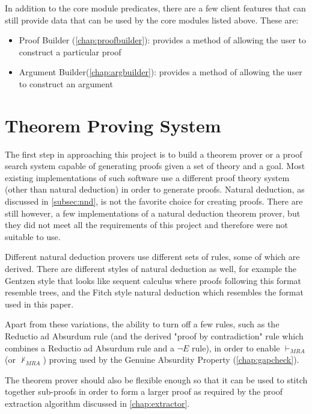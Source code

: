 \documentclass[11pt,twoside,a4paper]{report}
\begin{document}
In addition to the core module predicates, there are a few client features that can still provide data that can be used by the core modules listed above. These are:
\begin{itemize}
\item
Proof Builder (\autoref{chap:proofbuilder}): provides a method of allowing the user to construct a particular proof
\item
Argument Builder(\autoref{chap:argbuilder}): provides a method of allowing the user to construct an argument 
\end{itemize}

\chapter{Theorem Proving System}
\label{chap:prover}
The first step in approaching this project is to build a theorem prover or a proof search system capable of generating proofs given a set of theory and a goal. Most existing implementations of such software use a different proof theory system (other than natural deduction) in order to generate proofs. Natural deduction, as discussed in \autoref{subsec:nnd}, is not the favorite choice for creating proofs. There are still however, a few implementations of a natural deduction theorem prover, but they did not meet all the requirements of this project and therefore were not suitable to use.

Different natural deduction provers use different sets of rules, some of which are derived. There are different styles of natural deduction as well, for example the Gentzen style that looks like sequent calculus where proofs following this format resemble trees, and the Fitch style natural deduction which resembles the format used in this paper. 

Apart from these variations, the ability to turn off a few rules, such as the Reductio ad Absurdum rule (and the derived "proof by contradiction" rule which combines a Reductio ad Absurdum rule and a $\neg E$ rule), in order to enable $\vdash_{MRA}$ (or $\nvdash_{MRA}$) proving used by the Genuine Absurdity Property (\autoref{chap:gapcheck}).

The theorem prover should also be flexible enough so that it can be used to stitch together sub-proofs in order to form a larger proof as required by the proof extraction algorithm discussed in \autoref{chap:extractor}.
\end{document}
